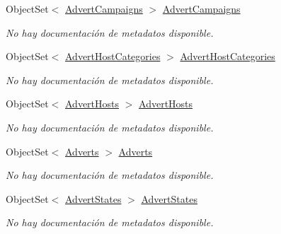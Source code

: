 \begin{DoxyCompactItemize}
Object\-Set$<$ \hyperlink{class_game_memory_1_1_advert_campaigns}{Advert\-Campaigns} $>$ \hyperlink{class_game_memory_1_1_o_m_k_t_d_b_entities_ab75a946df8e841e032003de37ac359dd}{Advert\-Campaigns}
\begin{DoxyCompactList}\small\item\em No hay documentación de metadatos disponible. \end{DoxyCompactList}\item 
Object\-Set$<$ \hyperlink{class_game_memory_1_1_advert_host_categories}{Advert\-Host\-Categories} $>$ \hyperlink{class_game_memory_1_1_o_m_k_t_d_b_entities_a91d353c35878832820892fb655266900}{Advert\-Host\-Categories}
\begin{DoxyCompactList}\small\item\em No hay documentación de metadatos disponible. \end{DoxyCompactList}\item 
Object\-Set$<$ \hyperlink{class_game_memory_1_1_advert_hosts}{Advert\-Hosts} $>$ \hyperlink{class_game_memory_1_1_o_m_k_t_d_b_entities_ae27958ef39c96e4ef422a60a1bd07572}{Advert\-Hosts}
\begin{DoxyCompactList}\small\item\em No hay documentación de metadatos disponible. \end{DoxyCompactList}\item 
Object\-Set$<$ \hyperlink{class_game_memory_1_1_adverts}{Adverts} $>$ \hyperlink{class_game_memory_1_1_o_m_k_t_d_b_entities_ac5da413d49a76b19ec5cd64055135752}{Adverts}
\begin{DoxyCompactList}\small\item\em No hay documentación de metadatos disponible. \end{DoxyCompactList}\item 
Object\-Set$<$ \hyperlink{class_game_memory_1_1_advert_states}{Advert\-States} $>$ \hyperlink{class_game_memory_1_1_o_m_k_t_d_b_entities_ae8585a7bdd0f94ad4fe4247d53ed541b}{Advert\-States}
\begin{DoxyCompactList}\small\item\em No hay documentación de metadatos disponible. \end{DoxyCompactList}\item 

\end{DoxyCompactItemize}
